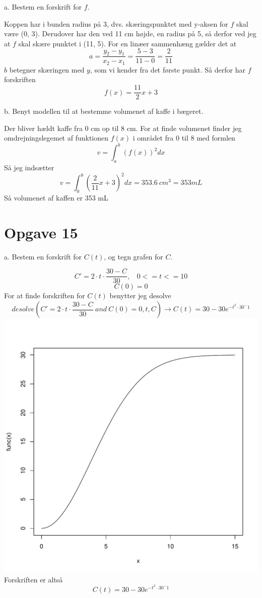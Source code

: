 \documentclass[12pt]{article}
\begin{document}
a. Bestem en forskrift for $f$.

Koppen har i bunden radius på 3, dvs. skæringspunktet med y-aksen for $f$ skal være (0, 3). Derudover
har den ved 11 cm højde, en radius på 5, så derfor ved jeg at $f$ skal skære punktet i (11, 5).
For en linæer sammenhæng gælder det at
$$a = \frac{y_2-y_1}{x_2-x_1} = \frac{5-3}{11-0} = \frac{2}{11}$$
$b$ betegner skæringen med $y$, som vi kender fra det første punkt. Så derfor har $f$ forskriften
$$f(x) = \frac{11}{2}x+3$$

b. Benyt modellen til at bestemme volumenet af kaffe i bægeret.

Der bliver hældt kaffe fra 0 cm op til 8 cm. For at finde volumenet finder jeg omdrejningslegemet af funktionen
$f(x)$ i området fra 0 til 8 med formlen
$$v = \int_a^b (f(x))^2 dx$$
Så jeg indsætter
$$v = \int_0^8 (\frac{2}{11}x+3)^2 dx = 353.6\ cm^3 = 353 mL$$
Så volumenet af kaffen er 353 mL

\section*{Opgave 15}

a. Bestem en forskrift for $C(t)$, og tegn grafen for $C$.

$$C' = 2\cdot t\cdot \frac{30-C}{30},~~~~0<=t<=10$$
$$C(0) = 0$$
For at finde forskriften for $C(t)$ benytter jeg desolve
$$desolve \left( C'=2\cdot t\cdot \frac{30-C}{30}~and~C(0)=0,t,C \right) \rightarrow C(t) = 30-30e^{-t^2\cdot 30^-1}$$
\includegraphics[width=\textwidth]{dia/15a.pdf}
Forskriften er altså
$$C(t) = 30-30e^{-t^2\cdot 30^-1}$$
\end{document}
